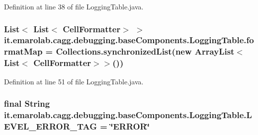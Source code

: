 Definition at line 38 of file Logging\-Table.\-java.

\hypertarget{classit_1_1emarolab_1_1cagg_1_1debugging_1_1baseComponents_1_1LoggingTable_a501474adab256e577d542e8775fbef4d}{
\subsubsection[{format\-Map}]{\setlength{\rightskip}{0pt plus 5cm}List$<$ List$<$ {\bf Cell\-Formatter}$>$ $>$ it.\-emarolab.\-cagg.\-debugging.\-base\-Components.\-Logging\-Table.\-format\-Map = Collections.\-synchronized\-List(new Array\-List$<$ List$<$ {\bf Cell\-Formatter}$>$$>$())\hspace{0.3cm}{\ttfamily [private]}}}\label{classit_1_1emarolab_1_1cagg_1_1debugging_1_1baseComponents_1_1LoggingTable_a501474adab256e577d542e8775fbef4d}


Definition at line 51 of file Logging\-Table.\-java.

\hypertarget{classit_1_1emarolab_1_1cagg_1_1debugging_1_1baseComponents_1_1LoggingTable_a19bb7a5bf70254f051f1b8caa5306a1f}{
\subsubsection[{L\-E\-V\-E\-L\-\_\-\-E\-R\-R\-O\-R\-\_\-\-T\-A\-G}]{\setlength{\rightskip}{0pt plus 5cm}final String it.\-emarolab.\-cagg.\-debugging.\-base\-Components.\-Logging\-Table.\-L\-E\-V\-E\-L\-\_\-\-E\-R\-R\-O\-R\-\_\-\-T\-A\-G = \char`\"{}E\-R\-R\-O\-R\char`\"{}\hspace{0.3cm}{\ttfamily [static]}}}\label{classit_1_1emarolab_1_1cagg_1_1debugging_1_1baseComponents_1_1LoggingTable_a19bb7a5bf70254f051f1b8caa5306a1f}


